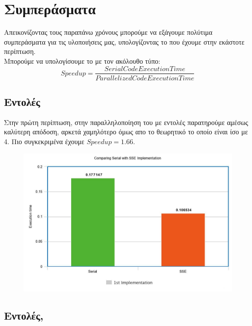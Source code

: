 \documentclass{article}
\begin{document}

\section{Συμπεράσματα}

Απεικονίζοντας τους παραπάνω χρόνους μπορούμε να εξάγουμε πολύτιμα συμπεράσματα για τις υλοποιήσεις μας, υπολογίζοντας το  που έχουμε στην εκάστοτε περίπτωση.\\
Μπορούμε να υπολογίσουμε το  με τον ακόλουθο τύπο:
\vspace{12mm}
\begin{equation}
     Speedup = \dfrac{Serial Code Execution Time}{Parallelized Code Execution Time}
\end{equation}


\subsection{ Εντολές}

Στην πρώτη περίπτωση, στην παραλληλοποίηση του  με  εντολές παρατηρούμε αμέσως καλύτερη απόδοση, αρκετά χαμηλότερο όμως απο το θεωρητικό 
 το οποίο είναι ίσο με 4. Πιο συγκεκριμένα έχουμε $Speedup = 1.66$.\\
\vspace{12mm}
\begin{figure}[h!]
\centering
  \includegraphics[width=0.8\linewidth]{SSE.jpeg}
  \caption{}
\end{figure}

\newpage
\subsection{ Εντολές, }
\end{document}
